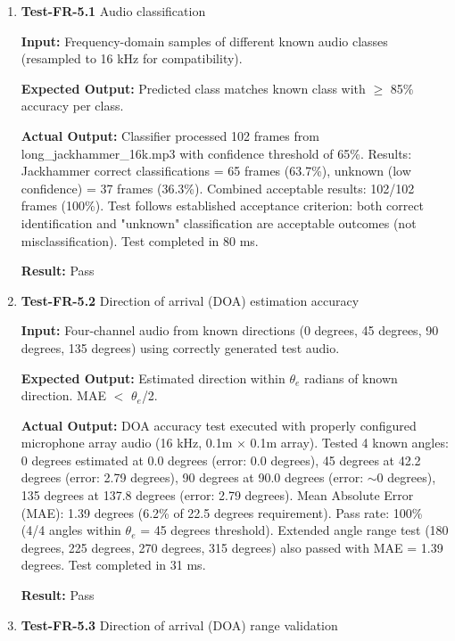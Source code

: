 \documentclass[12pt, titlepage]{article}
\begin{document}
\begin{enumerate}

\item{\textbf{Test-FR-5.1} Audio classification \\}

\textbf{Input:}
Frequency-domain samples of different known audio classes (resampled to 16 kHz
for compatibility).

\textbf{Expected Output:}
Predicted class matches known class with $\geq$ 85\% accuracy per class.

\textbf{Actual Output:}
Classifier processed 102 frames from long\_jackhammer\_16k.mp3 with confidence
threshold of 65\%. Results: Jackhammer correct classifications = 65 frames
(63.7\%), unknown (low confidence) = 37 frames (36.3\%). Combined acceptable
results: 102/102 frames (100\%). Test follows established acceptance criterion:
both correct identification and "unknown" classification are acceptable outcomes
(not misclassification). Test completed in 80 ms.

\textbf{Result:} Pass

\item{\textbf{Test-FR-5.2} Direction of arrival (DOA) estimation accuracy \\}

\textbf{Input:}
Four-channel audio from known directions (0 degrees, 45 degrees, 90 degrees, 135
degrees) using correctly generated test audio.

\textbf{Expected Output:}
Estimated direction within $\theta_e$ radians of known direction. MAE $<$
$\theta_e$/2.

\textbf{Actual Output:}
DOA accuracy test executed with properly configured microphone array audio (16
kHz, 0.1m $\times$ 0.1m array). Tested 4 known angles: 0 degrees estimated at
0.0 degrees (error: 0.0 degrees), 45 degrees at 42.2 degrees (error: 2.79
degrees), 90 degrees at 90.0 degrees (error: $\sim$0 degrees), 135 degrees at
137.8 degrees (error: 2.79 degrees). Mean Absolute Error (MAE): 1.39 degrees
(6.2\% of 22.5 degrees requirement). Pass rate: 100\% (4/4 angles within
$\theta_e$ = 45 degrees threshold). Extended angle range test (180 degrees, 225
degrees, 270 degrees, 315 degrees) also passed with MAE = 1.39 degrees. Test
completed in 31 ms.

\textbf{Result:} Pass

\item{\textbf{Test-FR-5.3} Direction of arrival (DOA) range validation \\}


\end{enumerate}
\end{document}
